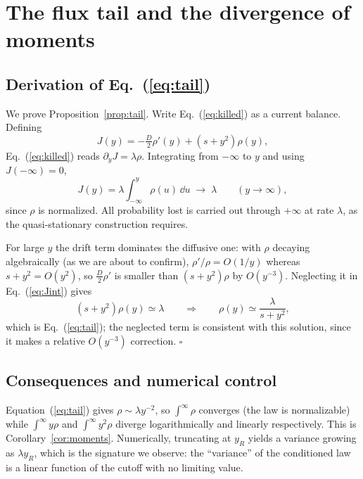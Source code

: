 \section{\label{app:tail}The flux tail and the divergence of moments}

\subsection{Derivation of Eq.~(\ref{eq:tail})}

We prove Proposition~\ref{prop:tail}.  Write Eq.~(\ref{eq:killed}) as a current balance.  Defining
\begin{equation}
J(y)=-\tfrac D2\rho'(y)+(s+y^2)\rho(y),
\end{equation}
Eq.~(\ref{eq:killed}) reads $\partial_yJ=\lambda\rho$.  Integrating from $-\infty$ to $y$ and using $J(-\infty)=0$,
\begin{equation}
\label{eq:Jint}
J(y)=\lambda\int_{-\infty}^{y}\rho(u)\,\dd u\;\longrightarrow\;\lambda
\qquad(y\to\infty),
\end{equation}
since $\rho$ is normalized.  All probability lost is carried out through $+\infty$ at rate $\lambda$, as the quasi-stationary construction requires.

For large $y$ the drift term dominates the diffusive one: with $\rho$ decaying algebraically (as we are about to confirm), $\rho'/\rho=O(1/y)$ whereas $s+y^2=O(y^2)$, so $\tfrac D2\rho'$ is smaller than $(s+y^2)\rho$ by $O(y^{-3})$.  Neglecting it in Eq.~(\ref{eq:Jint}) gives
\begin{equation}
(s+y^2)\rho(y)\simeq\lambda
\qquad\Longrightarrow\qquad
\rho(y)\simeq\frac{\lambda}{s+y^2},
\end{equation}
which is Eq.~(\ref{eq:tail}); the neglected term is consistent with this solution, since it makes a relative $O(y^{-3})$ correction.  $\square$

\subsection{Consequences and numerical control}

Equation~(\ref{eq:tail}) gives $\rho\sim\lambda y^{-2}$, so $\int^\infty\rho$ converges (the law is normalizable) while $\int^\infty y\rho$ and $\int^\infty y^2\rho$ diverge logarithmically and linearly respectively.  This is Corollary~\ref{cor:moments}.  Numerically, truncating at $y_R$ yields a variance growing as $\lambda y_R$, which is the signature we observe: the ``variance'' of the conditioned law is a linear function of the cutoff with no limiting value.

